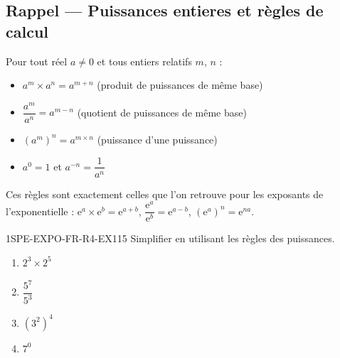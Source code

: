 

\subsection*{Rappel — Puissances entieres et règles de calcul}

Pour tout réel $a
\neq 0$ et tous entiers relatifs $m$, $n$ :
\begin{itemize}
  \item $a^m \times a^n = a^{m+n}$ \quad (produit de puissances de même base)
  \item $\dfrac{a^m}{a^n} = a^{m-n}$ \quad (quotient de puissances de même base)
  \item $(a^m)^n = a^{m \times n}$ \quad (puissance d'une puissance)
  \item $a^0 = 1$ \quad et \quad $a^{-n} = \dfrac{1}{a^n}$
\end{itemize}

Ces règles sont exactement celles que l'on retrouve pour les exposants de l'exponentielle :
$\mathrm{e}^a \times \mathrm{e}^b = \mathrm{e}^{a+b}$, $\dfrac{\mathrm{e}^a}{\mathrm{e}^b} = \mathrm{e}^{a-b}$, $(\mathrm{e}^a)^n = \mathrm{e}^{na}$.


\begin{exercice}{1SPE-EXPO-FR-R4-EX1}{1}{5}
Simplifier en utilisant les règles des puissances.
\begin{enumerate}
  \item $2^3 \times 2^5$
  \item $\dfrac{5^7}{5^3}$
  \item $(3^2)^4$
  \item $7^0$
\end{enumerate}
\end{exercice}

